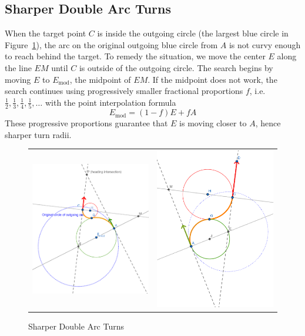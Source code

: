 \documentclass{article}
\begin{document}
\subsection*{Sharper Double Arc Turns}

When the target point $C$ is inside the outgoing circle (the largest blue circle in Figure~\ref{fig:sharper-turns}), the arc on the 
original outgoing blue circle from $A$ is not curvy enough to reach behind the target. To remedy the situation, we move the center $E$
along the line $EM$ until $C$ is outside of the outgoing circle. The search begins by moving $E$ to $E_\text{mod}$, 
the midpoint of $EM$. If the midpoint does not work, the search continues using progressively smaller fractional proportions 
$f$, i.e. $\frac12, \frac13, \frac14, \frac15, \ldots$ with the point interpolation formula $$E_\text{mod} = (1-f)E + fA$$
These progressive proportions guarantee that $E$ is moving closer to $A$, hence sharper turn radii.

\begin{figure}[hbt]
  \begin{tabular}{c|c}
\includegraphics[width=6cm]{screenshots/DoubleArcModCenter.png} &
\includegraphics[width=6cm]{screenshots/DoubleArcModCenterDiverging.png}
\end{tabular}
\caption{Sharper Double Arc Turns}
\label{fig:sharper-turns}
\end{figure}
\end{document}
